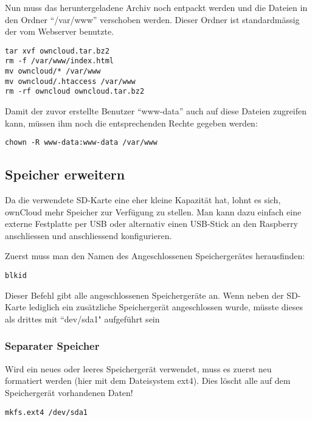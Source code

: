 Nun muss das heruntergeladene Archiv noch entpackt werden und die Dateien in den Ordner ``/var/www'' verschoben werden. Dieser Ordner ist standardmässig der vom Webserver benutzte.

\begin{lstlisting}
tar xvf owncloud.tar.bz2
rm -f /var/www/index.html
mv owncloud/* /var/www
mv owncloud/.htaccess /var/www
rm -rf owncloud owncloud.tar.bz2
\end{lstlisting}


Damit der zuvor erstellte Benutzer ``www-data'' auch auf diese Dateien zugreifen kann, müssen ihm noch die entsprechenden Rechte gegeben werden:

\begin{lstlisting}
chown -R www-data:www-data /var/www
\end{lstlisting}

\subsection{Speicher erweitern}
Da die verwendete SD-Karte eine eher kleine Kapazität hat, lohnt es sich, ownCloud mehr Speicher zur Verfügung zu stellen. Man kann dazu einfach eine externe Festplatte per USB oder alternativ einen USB-Stick an den Raspberry anschliessen und anschliessend konfigurieren.

Zuerst muss man den Namen des Angeschlossenen Speichergerätes herausfinden: 

\begin{lstlisting}
blkid
\end{lstlisting}

Dieser Befehl gibt alle angeschlossenen Speichergeräte an. Wenn neben der SD-Karte lediglich ein zusätzliche Speichergerät angeschlossen wurde, müsste dieses als drittes mit ``dev/sda1" aufgeführt sein

\subsubsection{Separater Speicher}
Wird ein neues oder leeres Speichergerät verwendet, muss es zuerst neu formatiert werden (hier mit dem Dateisystem ext4). Dies löscht alle auf dem Speichergerät vorhandenen Daten!

\begin{lstlisting}
mkfs.ext4 /dev/sda1
\end{lstlisting}

